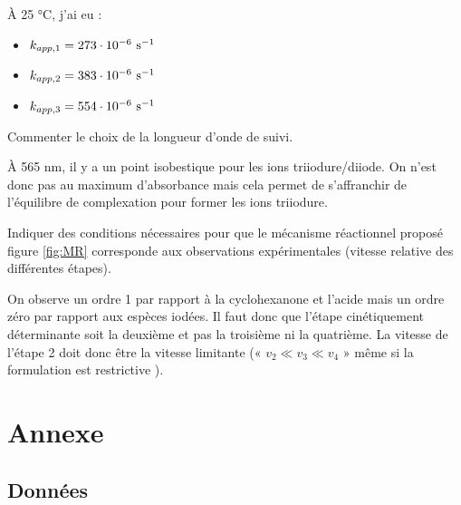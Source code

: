\documentclass[twoside,a4paper,11pt,answers]{exam}
\begin{document}
\begin{questions}
\begin{framed}
\begin{solution}[3cm]
À 25 °C, j'ai eu :
\begin{itemize}
\item $k_{app,1}=273\cdot 10^{-6}~\mathrm{s^{-1}}$
\item $k_{app,2}=383\cdot 10^{-6}~\mathrm{s^{-1}}$
\item $k_{app,3}=554\cdot 10^{-6}~\mathrm{s^{-1}}$
\end{itemize}
\end{solution}
\end{framed}


\begin{framed}
\question  Commenter le choix de la longueur d'onde de suivi.
\begin{solution}[3cm]
À 565 nm, il y a un point isobestique pour les ions triiodure/diiode. On n'est donc pas au maximum d'absorbance mais cela permet de s'affranchir de l'équilibre de complexation pour former les ions triiodure.
\end{solution}
\end{framed}

\begin{framed}
\question Indiquer des conditions nécessaires pour que le mécanisme réactionnel proposé figure \ref{fig:MR} corresponde aux observations expérimentales (vitesse relative des différentes étapes).
\begin{solution}[3cm]
On observe un ordre 1 par rapport à la cyclohexanone et l'acide mais un ordre zéro par rapport aux espèces iodées. Il faut donc que l'étape cinétiquement déterminante soit la deuxième et pas la troisième ni la quatrième. La vitesse de l'étape 2 doit donc être la vitesse limitante (« $v_2\ll v_3 \ll v_4$ » même si la formulation est restrictive ).
\end{solution}
\end{framed}

\end{questions}

\newpage
\section*{Annexe}

\subsection*{Données}
\end{document}

